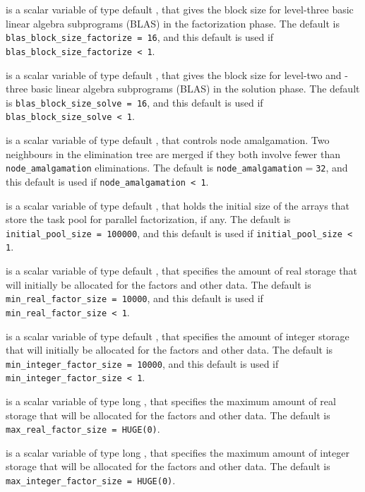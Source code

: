 \documentclass{galahad}
\begin{document}
\begin{description}
 is a scalar variable of type default \integer,
that gives the block size for level-three basic linear algebra subprograms
(BLAS) in the factorization phase.
The default is {\tt blas\_block\_size\_factorize = 16},
and this default is used if {\tt blas\_block\_size\_factorize < 1}.

 is a scalar variable of type default \integer,
that gives the block size for level-two and -three basic linear algebra
subprograms (BLAS) in the solution phase.
The default is {\tt blas\_block\_size\_solve = 16},
and this default is used if {\tt blas\_block\_size\_solve < 1}.

 is a scalar variable of type default \integer,
that controls node amalgamation. Two neighbours in the elimination tree are
merged if they both involve fewer than {\tt node\_amalgamation} eliminations.
The default is {\tt node\_amalgamation$=$32}, and this default is used
if {\tt node\_amalgamation < 1}.

 is a scalar variable of type default \integer,
that holds the initial size of the arrays that store the task pool for
parallel factorization, if any.
The default is {\tt initial\_pool\_size = 100000},
and this default is used if {\tt initial\_pool\_size < 1}.

 is a scalar variable of type default \integer,
that specifies the amount of real storage that will initially be
allocated for the factors and other data.
The default is {\tt min\_real\_factor\_size = 10000},
and this default is used if {\tt min\_real\_factor\_size < 1}.

 is a scalar variable of type default \integer,
that specifies the amount of integer storage that will initially be
allocated for the factors and other data.
The default is {\tt min\_integer\_factor\_size = 10000},
and this default is used if {\tt min\_integer\_factor\_size < 1}.

 is a scalar variable of type long \integer,
that specifies the maximum amount of real storage that will be
allocated for the factors and other data.
The default is {\tt max\_real\_factor\_size = HUGE(0)}.

 is a scalar variable of type long \integer,
that specifies the maximum amount of integer storage that will be
allocated for the factors and other data.
The default is {\tt max\_integer\_factor\_size = HUGE(0)}.


\end{description}
\end{document}
